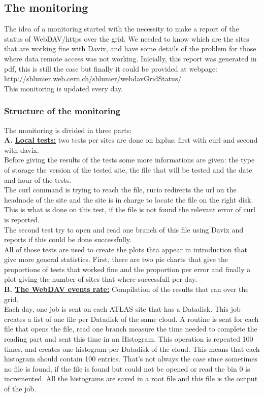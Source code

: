 \subsection{The monitoring}
\label{sec:monitoring}

The idea of a monitoring started with the necessity to make a report of the status of WebDAV/https over the grid. We needed to know which are the sites that are working fine with Davix, and have some details of the problem for those where data remote access was not working. Inicially, this report was generated in pdf, this is still the case but finally it could be provided at webpage:\\
\url{http://sblunier.web.cern.ch/sblunier/webdavGridStatus/}\\

This monitoring is updated every day.

\subsubsection{Structure of the monitoring}
The monitoring is divided in three parts:\\

\indent	\textbf{A. \underline{Local tests:}} two tests per sites are done on lxplus: first with curl and second with davix.\\
Before giving the results of the tests some more informations are given: the type of storage the version of the tested site, the file that will be tested and the date and hour of the tests.\\
The curl command is trying to reach the file, rucio redirects the url on the headnode of the site and the site is in charge to locate the file on the right disk. This is what is done on this test, if the file is not found the relevant error of curl is reported.\\
The second test try to open and read one branch of this file using Davix and reports if this could be done successfully.\\
All of those tests are used to create the plots thta appear in introduction that give more general statistics. First, there are two pie charts that give the proportions of tests that worked fine and the proportion per error and finally a plot giving the number of sites that where successfull per day.\\

\indent	\textbf{B. \underline{The WebDAV events rate:}} Compilation of the results that ran over the grid.\\
Each day, one job is sent on each ATLAS site that has a Datadisk. This job creates a list of one file per Datadisk of the same cloud. A routine is sent for each file that opens the file, read one branch measure the time needed to complete the reading part and sent this time in an Histogram. This operation is repeated 100 times, and creates one histogram per Datadisk of the cloud. This means that each histogram should contain 100 entries. That's not always the case since sometimes no file is found, if the file is found but could not be opened or read the bin 0 is incremented. All the histograms are saved in a root file and this file is the output of the job.\\

